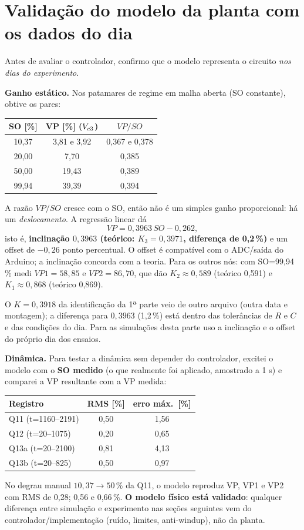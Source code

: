 \section{Validação do modelo da planta com os dados do dia}\label{expplanta}
Antes de avaliar o controlador, confirmo que o modelo representa o circuito \emph{nos dias do experimento}.

\textbf{Ganho estático.} Nos patamares de regime em malha aberta (SO constante), obtive os pares:
\begin{center}\small
\begin{tabular}{ccc}\toprule SO [\%] & VP [\%] ($V_{c3}$) & $VP/SO$\\\midrule
10,37 & 3,81 e 3,92 & 0,367 e 0,378\\ 20,00 & 7,70 & 0,385\\ 50,00 & 19,43 & 0,389\\ 99,94 & 39,39 & 0,394\\\bottomrule\end{tabular}\end{center}
A razão $VP/SO$ cresce com o SO, então não é um simples ganho proporcional: há um \emph{deslocamento}. A regressão linear dá
\[
VP=0{,}3963\,SO-0{,}262,
\]
isto é, \textbf{inclinação $0{,}3963$ (teórico: $K_3=0{,}3971$, diferença de 0,2\,\%)} e um offset de $-0{,}26$ ponto percentual. O offset é compatível com o ADC/saída do Arduino; a inclinação concorda com a teoria. Para os outros nós: com SO=99,94\,\% medi $VP1=58{,}85$ e $VP2=86{,}70$, que dão $K_2\approx0{,}589$ (teórico 0,591) e $K_1\approx0{,}868$ (teórico 0,869).
\begin{just}O $K=0{,}3918$ da identificação da 1ª parte veio de outro arquivo (outra data e montagem); a diferença para $0{,}3963$ (1,2\,\%) está dentro das tolerâncias de $R$ e $C$ e das condições do dia. Para as simulações desta parte uso a inclinação e o offset do próprio dia dos ensaios.\end{just}

\textbf{Dinâmica.} Para testar a dinâmica sem depender do controlador, excitei o modelo com o \textbf{SO medido} (o que realmente foi aplicado, amostrado a 1 s) e comparei a VP resultante com a VP medida:
\begin{center}\small
\begin{tabular}{lcc}\toprule Registro & RMS [\%] & erro máx.\ [\%]\\\midrule
Q11 (t=1160--2191) & 0,50 & 1,56\\ Q12 (t=20--1075) & 0,20 & 0,65\\ Q13a (t=20--2100) & 0,81 & 4,13\\ Q13b (t=20--825) & 0,50 & 0,97\\\bottomrule\end{tabular}\end{center}
No degrau manual $10{,}37\to50\,\%$ da Q11, o modelo reproduz VP, VP1 e VP2 com RMS de 0,28; 0,56 e 0,66\,\%. \textbf{O modelo físico está validado}: qualquer diferença entre simulação e experimento nas seções seguintes vem do controlador/implementação (ruído, limites, anti-windup), não da planta.

